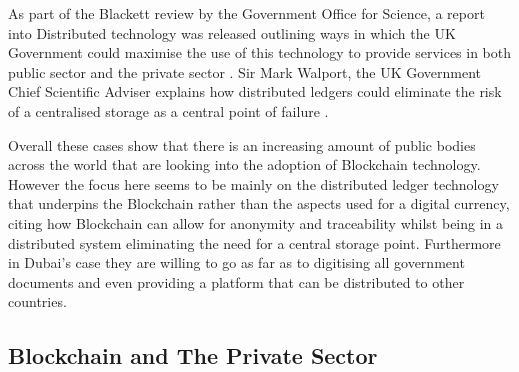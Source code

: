 \documentclass{article}
\begin{document}
\par
As part of the Blackett review by the Government Office for Science, a report into Distributed technology was released outlining ways in which the UK Government could maximise the use of this technology to provide services in both public sector and the private sector \parencite{ukdlt}. Sir Mark Walport, the UK Government Chief Scientific Adviser explains how distributed ledgers could eliminate the risk of a centralised storage as a central point of failure \parencite{ukdlt2}.
\par
Overall these cases show that there is an increasing amount of public bodies across the world that are looking into the adoption of Blockchain technology. However the focus here seems to be mainly on the distributed ledger technology that underpins the Blockchain rather than the aspects used for a digital currency, citing how Blockchain can allow for anonymity and traceability whilst being in a distributed system eliminating the need for a central storage point. Furthermore in Dubai's case they are willing to go as far as to digitising all government documents and even providing a platform that can be distributed to other countries.

\subsection{Blockchain and The Private Sector}
\end{document}
